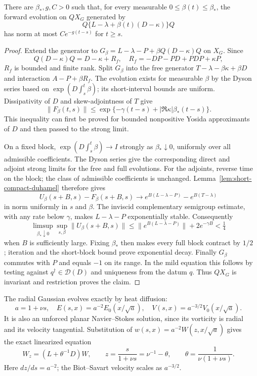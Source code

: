 \begin{lemma}
\label{lem:short-diffusion-complement}
There are $\beta_*,g,C>0$ such that, for every measurable
$0\le\beta(t)\le\beta_*$, the forward evolution on $QX_G$ generated by
\[
 Q\{L-\lambda+\beta(t)(D-\kappa)\}Q
\]
has norm at most $Ce^{-g(t-s)}$ for $t\ge s$.
\end{lemma}
\begin{proof}
Extend the generator to
$G_\beta=L-\lambda-P+\beta Q(D-\kappa)Q$ on $X_G$. Since
\[
 Q(D-\kappa)Q=D-\kappa+R_f,
 \quad R_f=-DP-PD+PDP+\kappa P,
\]
$R_f$ is bounded and finite rank. Split $G_\beta$ into the free
generator $T-\lambda-\beta\kappa+\beta D$ and interaction
$A-P+\beta R_f$. The evolution exists for measurable $\beta$ by the
Dyson series based on $\exp(D\int_s^t\beta)$; its short-interval
bounds are uniform. Dissipativity of $D$ and skew-adjointness of $T$
give
\[
 \|F_\beta(t,s)\|
 \le\exp\{-\gamma(t-s)+|\Re\kappa|\beta_*(t-s)\}.
\]
This inequality can first be proved for bounded nonpositive Yosida
approximants of $D$ and then passed to the strong limit.

On a fixed block, $\exp(D\int_s^t\beta)\to I$ strongly as
$\beta_*\downarrow0$, uniformly over all admissible coefficients.
The Dyson series give the corresponding direct and adjoint strong
limits for the free and full evolutions. For the adjoints, reverse
time on the block; the class of admissible coefficients is unchanged.
Lemma~\ref{lem:short-compact-duhamel} therefore gives
\[
 U_\beta(s+B,s)-F_\beta(s+B,s)
 \longrightarrow e^{B(L-\lambda-P)}-e^{B(T-\lambda)}
\]
in norm uniformly in $s$ and $\beta$. The inviscid complementary
semigroup estimate, with any rate below $\gamma$, makes
$L-\lambda-P$ exponentially stable. Consequently
\[
 \limsup_{\beta_*\downarrow0}\sup_{s,\beta}
 \|U_\beta(s+B,s)\|
 \le \|e^{B(L-\lambda-P)}\|+2e^{-\gamma B}<\tfrac14
\]
when $B$ is sufficiently large. Fixing $\beta_*$ then makes every
full block contract by $1/2$; iteration and the short-block bound
prove exponential decay. Finally $G_\beta$ commutes with $P$ and
equals $-1$ on its range. In the mild equation this follows by testing
against $q^\dagger\in\mathcal D(D)$ and uniqueness from the datum
$q$. Thus $QX_G$ is invariant and restriction proves the claim.
\end{proof}

The radial Gaussian evolves exactly by heat diffusion:
\[
 a=1+\nu s,\quad E(s,x)=a^{-2}E_0(x/\sqrt a),\quad
 V(s,x)=a^{-3/2}V_0(x/\sqrt a).
\]
It is also an unforced planar Navier--Stokes solution, since its
vorticity is radial and its velocity tangential. Substitution of
$w(s,x)=a^{-2}W(z,x/\sqrt a)$ gives the exact linearized equation
\begin{equation}\label{eq:short-heat-clock}
 W_z=(L+\theta^{-1}D)W,\qquad
 z=\frac{s}{1+\nu s}=\nu^{-1}-\theta,
 \qquad \theta=\frac1{\nu(1+\nu s)}.
\end{equation}
Here $dz/ds=a^{-2}$; the Biot--Savart velocity scales as $a^{-3/2}$.

